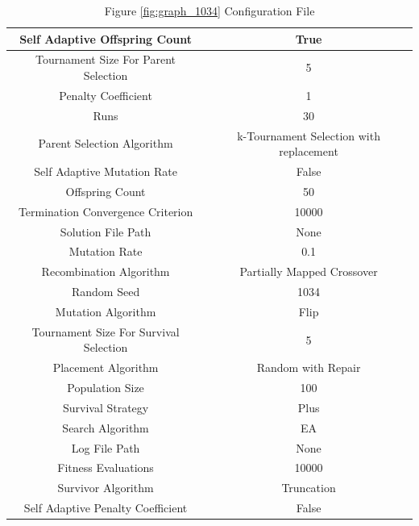 \documentclass{standalone}
\begin{document}
\begin{table}[!htb]
	\centering
	\caption{Figure \ref{fig:graph_1034} Configuration File}
	\label{tab:graph_1034}
	\begin{tabular}{| c | c |}
		\hline
		Self Adaptive Offspring Count		& True		 \\
		\hline
		Tournament Size For Parent Selection		& 5		 \\
		\hline
		Penalty Coefficient		& 1		 \\
		\hline
		Runs		& 30		 \\
		\hline
		Parent Selection Algorithm		& k-Tournament Selection with replacement		 \\
		\hline
		Self Adaptive Mutation Rate		& False		 \\
		\hline
		Offspring Count		& 50		 \\
		\hline
		Termination Convergence Criterion		& 10000		 \\
		\hline
		Solution File Path		& None		 \\
		\hline
		Mutation Rate		& 0.1		 \\
		\hline
		Recombination Algorithm		& Partially Mapped Crossover		 \\
		\hline
		Random Seed		& 1034		 \\
		\hline
		Mutation Algorithm		& Flip		 \\
		\hline
		Tournament Size For Survival Selection		& 5		 \\
		\hline
		Placement Algorithm		& Random with Repair		 \\
		\hline
		Population Size		& 100		 \\
		\hline
		Survival Strategy		& Plus		 \\
		\hline
		Search Algorithm		& EA		 \\
		\hline
		Log File Path		& None		 \\
		\hline
		Fitness Evaluations		& 10000		 \\
		\hline
		Survivor Algorithm		& Truncation		 \\
		\hline
		Self Adaptive Penalty Coefficient		& False		 \\
		\hline
	\end{tabular}
\end{table}
\end{document}
